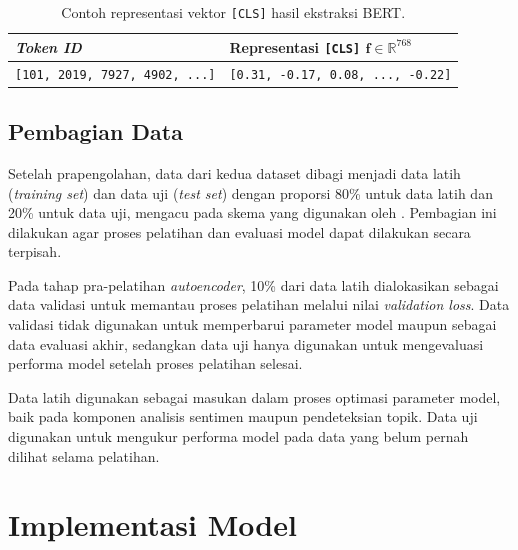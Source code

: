 \begin{table}[H]
    \centering
    \caption{Contoh representasi vektor \texttt{[CLS]} hasil ekstraksi BERT.}
    \label{tab:bert_repr}
    \begin{tabular}{p{} p{}}
        \hline
        \textbf{\textit{Token ID}} &
        \textbf{Representasi \texttt{[CLS]} $\mathbf{f} \in \mathbb{R}^{768}$} \\
        \hline
        \texttt{[101, 2019, 7927, 4902, ...]} &
        \texttt{[0.31, -0.17, 0.08, ..., -0.22]} \\
        \hline
    \end{tabular}
\end{table}

\subsection{Pembagian Data}

Setelah prapengolahan, data dari kedua dataset dibagi menjadi data latih
(\textit{training set}) dan data uji (\textit{test set}) dengan proporsi
80\% untuk data latih dan 20\% untuk data uji, mengacu pada skema yang
digunakan oleh \parencite{gowandi2021}. Pembagian ini dilakukan agar proses
pelatihan dan evaluasi model dapat dilakukan secara terpisah.

Pada tahap pra-pelatihan \textit{autoencoder}, 10\% dari data latih
dialokasikan sebagai data validasi untuk memantau proses pelatihan melalui
nilai \textit{validation loss}. Data validasi tidak digunakan untuk
memperbarui parameter model maupun sebagai data evaluasi akhir, sedangkan
data uji hanya digunakan untuk mengevaluasi performa model setelah proses
pelatihan selesai.

Data latih digunakan sebagai masukan dalam proses optimasi parameter model,
baik pada komponen analisis sentimen maupun pendeteksian topik. Data uji
digunakan untuk mengukur performa model pada data yang belum pernah dilihat
selama pelatihan.

\section{Implementasi Model}

